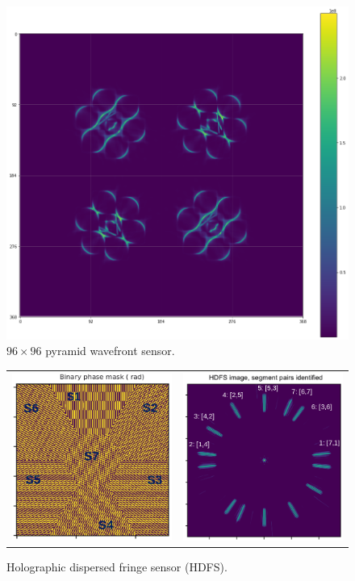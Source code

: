 \documentclass[]{AO4ELT}  %
\begin{document}
\begin{figure}
   \centering
   \includegraphics[trim=1cm 2cm 5cm 2cm,clip,width=0.6\linewidth]{./figures/pyramid.png}
   \caption{$96\times 96$ pyramid wavefront sensor.}
   \label{fig:13}
\end{figure}

\begin{figure}
   \centering
   \begin{tabular}{cc}
      \includegraphics[width=0.4\linewidth]{./figures/hdfs_mask.png} &
      \includegraphics[width=0.4\linewidth]{./figures/hdfs_image.png}
   \end{tabular}
   \caption{Holographic dispersed fringe sensor (HDFS).}
   \label{fig:14}
\end{figure}
\end{document}
